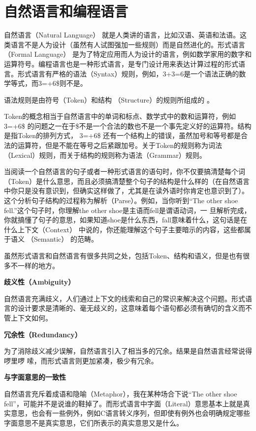 \documentclass[12pt]{book}
\begin{document}
\section{自然语言和编程语言}

自然语言（Natural Language）
就是人类讲的语言，比如汉语、英语和法语。这类语言不是人为设计（虽然有人试图强加一些规则）而是自然进化的。形式语言（Formal
Language）
是为了特定应用而人为设计的语言，例如数学家用的数字和运算符号。编程语言也是一种形式语言，是专门设计用来表达计算过程的形式语言。形式语言有严格的语法（Syntax）规则，例如，3+3=6是一个语法正确的数学等式，而3=+6\$则不是。

语法规则是由符号（Token）和结构 （Structure）的规则所组成的 。

Token的概念相当于自然语言中的单词和标点、数学式中的数和运算符，例如3=+6\$
的问题之一在于\$不是一个合法的数也不是一个事先定义好的运算符。结构是指Token的排列方式，
3=+6\$
还有一个结构上的错误，虽然加号和等号都是合法的运算符，但是不能在等号之后紧跟加号。关于Token的规则称为词法（Lexical）规则，而关于结构的规则称为语法（Grammar）规则。

当阅读一个自然语言的句子或者一种形式语言的语句时，你不仅要搞清楚每个词（Token）是什么意思，而且必须搞清楚整个句子的结构是什么样的（在自然语言中你只是没有意识到，但确实这样做了，尤其是在读外语时你肯定也意识到了）。这个分析句子结构的过程称为解析（Parse）。例如，当你听到``The
other shoe fell.''这个句子时，你理解the other
shoe是主语而fell是谓语动词，一
旦解析完成，你就搞懂了句子的意思，如果知道shoe是什么东西，fall意味着什么，这句话是在什么上下文（Context）
中说的，你还能理解这个句子主要暗示的内容，这些都属于语义 （Semantic）
的范畴。

虽然形式语言和自然语言有很多共同之处，包括Token、结构和语义，但是也有很多不一样的地方。

\textbf{歧义性（Ambiguity）}

自然语言充满歧义，人们通过上下文的线索和自己的常识来解决这个问题。形式语言的设计要求是清晰的、毫无歧义的，这意味着每个语句都必须有确切的含义而不管上下文如何。

\textbf{冗余性（Redundancy）}

为了消除歧义减少误解，自然语言引入了相当多的冗余。结果是自然语言经常说得啰里啰
嗦，而形式语言则更加紧凑，极少有冗余。

\textbf{与字面意思的一致性}

自然语言充斥着成语和隐喻（Metaphor），我在某种场合下说``The other shoe
fell''，可能并不是说谁的鞋掉了。而形式语言中字面（Literal）意思基本上就是真实意思，也会有一些例外，例如C语言转义序列，但即使有例外也会明确规定哪些字面意思不是真实意思，它们所表示的真实意思又是什么。
\end{document}
